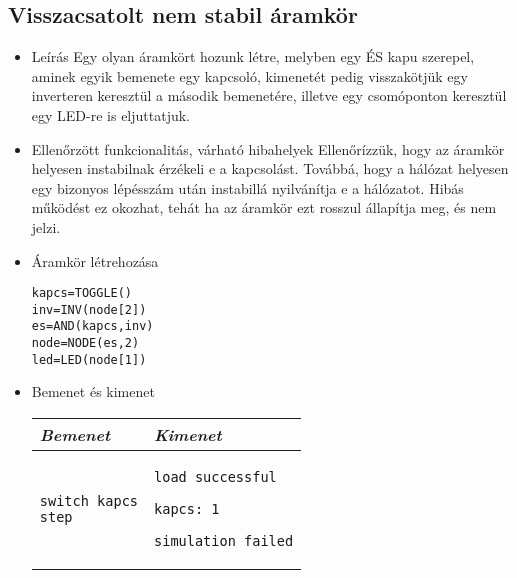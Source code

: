 \subsection{Visszacsatolt nem stabil áramkör}
\begin{itemize}
\item Leírás\newline
Egy olyan áramkört hozunk létre, melyben egy ÉS kapu szerepel, aminek egyik bemenete egy kapcsoló, kimenetét pedig visszakötjük egy inverteren keresztül a második bemenetére, illetve egy csomóponton keresztül egy LED-re is eljuttatjuk.
\item Ellenőrzött funkcionalitás, várható hibahelyek\newline
Ellenőrízzük, hogy az áramkör helyesen instabilnak érzékeli e a kapcsolást. Továbbá, hogy a hálózat helyesen egy bizonyos lépésszám után instabillá nyilvánítja e a hálózatot. Hibás működést ez okozhat, tehát ha az áramkör ezt rosszul állapítja meg, és nem jelzi.

\item Áramkör létrehozása

\begin{verbatim}
kapcs=TOGGLE()
inv=INV(node[2])
es=AND(kapcs,inv)
node=NODE(es,2)
led=LED(node[1])
\end{verbatim}

\item Bemenet és kimenet\newline

\begin{tabular}{|p{7cm}|p{7cm}|} 
\hline 
\textit{Bemenet} & \textit{Kimenet} \\ \hline
\begin{verbatim}
switch kapcs
step
\end{verbatim}
& 
\begin{verbatim}
load successful

kapcs: 1

simulation failed
\end{verbatim}
\\ \hline
\end{tabular}

\end{itemize}


